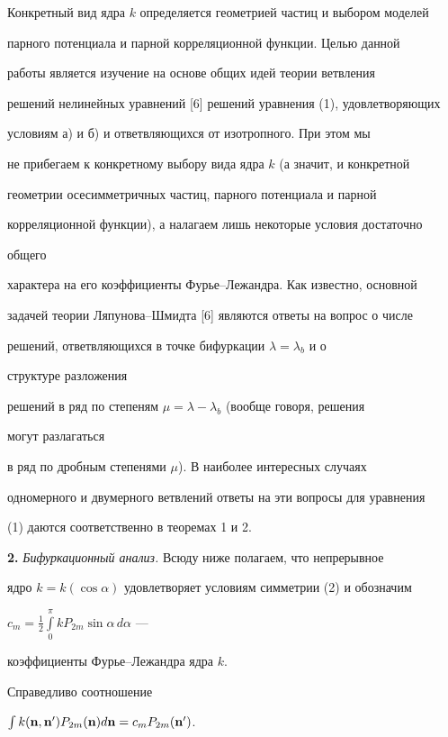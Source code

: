 Конкретный вид ядра $k$ определяется геометрией частиц и выбором моделей


парного потенциала и парной корреляционной функции. Целью данной


работы является изучение на основе общих идей теории ветвления 


решений нелинейных уравнений [6] решений уравнения (1), удовлетворяющих 


условиям а) и б) и ответвляющихся от изотропного. При этом мы 


не прибегаем к конкретному выбору вида ядра $k$ (а значит, и конкретной 


геометрии осесимметричных частиц, парного потенциала и парной 


корреляционной функции), а налагаем лишь некоторые условия достаточно 


общего 


характера на его коэффициенты Фурье--Лежандра. Как известно, основной 


задачей теории Ляпунова--Шмидта [6] являются ответы на вопрос о числе 


решений, ответвляющихся в точке бифуркации $\lambda=\lambda_b$ и о 


структуре разложения 


решений в ряд по степеням $\mu=\lambda-\lambda_b$ (вообще говоря, решения 


могут разлагаться 


в ряд по дробным степенями $\mu$). В наиболее интересных случаях 


одномерного и двумерного ветвлений ответы на эти вопросы для уравнения


(1) даются соответственно в теоремах 1 и 2.


\medskip





{\bf 2.} {\it Бифуркационный анализ.} Всюду ниже полагаем, что непрерывное 


ядро $k=k(\cos\alpha)$ удовлетворяет условиям симметрии (2) и обозначим


$c_m=\frac{1}{2}\int\limits^\pi_0 k P_{2m}\sin\alpha\,d\alpha$ --- 


коэффициенты Фурье--Ле\-жанд\-ра ядра $k$.





\begin{prop}


Справедливо соотношение


$\int k(\bold n,\bold n')P_{2m}(\bold n)d\bold n=c_m P_{2m}(\bold n')$.


\end{prop}






